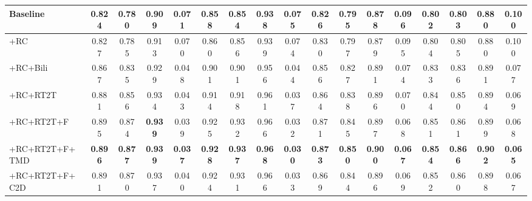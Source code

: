 \documentclass[10pt,twocolumn,letterpaper]{article}
\def\blu#1{\textbf{\color{blue} #1}} \def\red#1{\textbf{\color{red}\underline{#1}}}
\begin{document}
\begin{table*}[!ht]
\begin{tabular}{l|l|cccc|cccc|cccc|cccc}
\multicolumn{2}{l|}{Baseline}  &0.824  &0.780  &0.909  &0.071 &0.858  &0.854  &0.938  &0.075 &0.826 &0.795 &0.878  &0.096 &0.802 &0.803  &0.880 &0.100 \\ \hline
\multicolumn{2}{l|}{+RC}      &0.827  &0.785  &0.913  &0.070 &0.860  &0.856  &0.939  &0.074 &0.830 &0.797 &0.879  &0.095 &0.804 &0.805  &0.880 &0.100  \\ \hline
\multicolumn{2}{l|}{+RC+Bili} &0.867  &0.835  &0.929  &0.048 &0.901  &0.901  &0.956  &0.044 &0.856 &0.827 &0.891  &0.074 &0.833 &0.836  &0.891 &0.077   \\
\multicolumn{2}{l|}{+RC+RT2T} &0.881  &0.856  &0.934  &0.043 &0.914  &0.918  &0.961  &0.037 &0.864 &0.838 &0.896  &0.070 &0.844 &0.850  &0.894 &0.069    \\ \hline
\multicolumn{2}{l|}{+RC+RT2T+F}  &0.895  &0.874  &\blu{0.939} &0.039 &0.925 &0.932 &0.966  &0.032 &0.871 &0.845 &0.897  &0.068 &0.851 &0.861  &0.899 &0.068  \\
\multicolumn{2}{l|}{+RC+RT2T+F+TMD}  &\blu{0.896}  &\blu{0.877} &\blu{0.939} &\blu{0.037} &\blu{0.928} &\blu{0.937} &\blu{0.968} &\blu{0.030} &\blu{0.873} &\blu{0.850} &\blu{0.900} &\blu{0.067} &\blu{0.854} &\blu{0.866} &\blu{0.902} &\blu{0.065}\\ \hline
\multicolumn{2}{l|}{+RC+RT2T+F+C2D}  &0.891  &0.870 &0.937 &0.040 &0.924 &0.931 &0.966 &0.033 &0.869 &0.844 &0.896 &0.069 &0.852 &0.860 &0.898 &0.067\\ \hline
\end{tabular}
\label{ablationTab2}
\end{table*}
\end{document}

